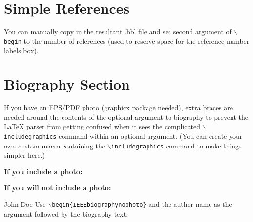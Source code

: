 \documentclass[lettersize,journal]{IEEEtran}
\begin{document}
\section{Simple References}
You can manually copy in the resultant .bbl file and set second argument of $\backslash${\tt{begin}} to the number of references
 (used to reserve space for the reference number labels box).

%




\newpage

\section{Biography Section}
If you have an EPS/PDF photo (graphicx package needed), extra braces are
 needed around the contents of the optional argument to biography to prevent
 the LaTeX parser from getting confused when it sees the complicated
 $\backslash${\tt{includegraphics}} command within an optional argument. (You can create
 your own custom macro containing the $\backslash${\tt{includegraphics}} command to make things
 simpler here.)
 
\vspace{11pt}

\bf{If you include a photo:}\vspace{-33pt}

\vspace{11pt}

\bf{If you will not include a photo:}\vspace{-33pt}
\begin{IEEEbiographynophoto}{John Doe}
Use $\backslash${\tt{begin\{IEEEbiographynophoto\}}} and the author name as the argument followed by the biography text.
\end{IEEEbiographynophoto}




\vfill
\end{document}
